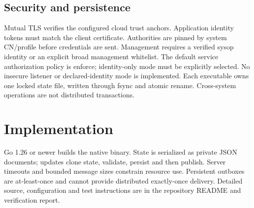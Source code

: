 \documentclass[a4paper]{arrowhead}
\begin{document}
\subsection{Security and persistence}
Mutual TLS verifies the configured cloud trust anchors. Application identity tokens must match the client certificate. Authorities are pinned by system CN/profile before credentials are sent. Management requires a verified sysop identity or an explicit broad management whitelist. The default service authorization policy is enforce; identity-only mode must be explicitly selected. No insecure listener or declared-identity mode is implemented. Each executable owns one locked state file, written through fsync and atomic rename. Cross-system operations are not distributed transactions.
\section{Implementation}
Go 1.26 or newer builds the native binary. State is serialized as private JSON documents; updates clone state, validate, persist and then publish. Server timeouts and bounded message sizes constrain resource use. Persistent outboxes are at-least-once and cannot provide distributed exactly-once delivery. Detailed source, configuration and test instructions are in the repository README and verification report.
\end{document}
